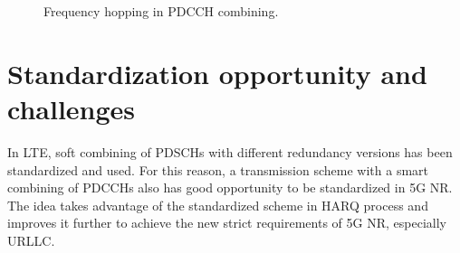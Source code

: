 \documentclass[conference]{IEEEtran}
\begin{document}
\begin{figure}[htbp]
\centering
{}
\hfill
\qquad
{}
\hfill
\caption{Frequency hopping in PDCCH combining.}
\label{fig5}
\end{figure}
\section{Standardization opportunity and challenges}

In LTE, soft combining of PDSCHs with different redundancy versions has been standardized and used. For this reason, a transmission scheme with a smart combining of PDCCHs also has good opportunity to be standardized in 5G NR. The idea takes advantage of the standardized scheme in HARQ process and improves it further to achieve the new strict requirements of 5G NR, especially URLLC.
\end{document}

